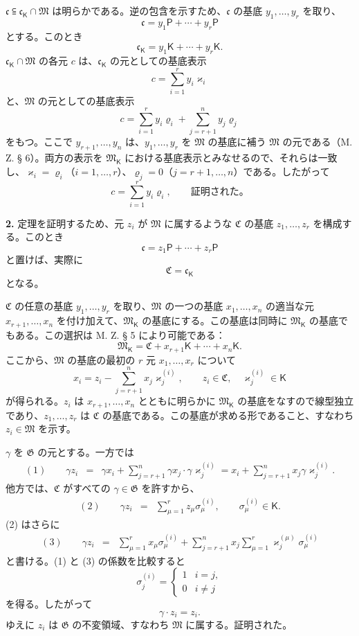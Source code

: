 $\mathfrak c\subseteqq\mathfrak c_{\mathsf K}\cap\mathfrak M$ は明らかである。逆の包含を示すため、$\mathfrak c$ の基底 $y_1,\ldots,y_r$ を取り、
\[
\mathfrak c=y_1\mathsf P+\cdots+y_r\mathsf P
\]
とする。このとき
\[
\mathfrak c_{\mathsf K}=y_1\mathsf K+\cdots+y_r\mathsf K.
\]
$\mathfrak c_{\mathsf K}\cap\mathfrak M$ の各元 $c$ は、$\mathfrak c_{\mathsf K}$ の元としての基底表示
\[
c=\sum_{i=1}^{r}y_i\varkappa_i
\]
と、$\mathfrak M$ の元としての基底表示
\[
c=\sum_{i=1}^{r}y_i\varrho_i+\sum_{j=r+1}^{n}y_j\varrho_j
\]
をもつ。ここで $y_{r+1},\ldots,y_n$ は、$y_1,\ldots,y_r$ を $\mathfrak M$ の基底に補う $\mathfrak M$ の元である（M. Z. § 6）。両方の表示を $\mathfrak M_{\mathsf K}$ における基底表示とみなせるので、それらは一致し、$\varkappa_i=\varrho_i$（$i=1,\ldots,r$）、$\varrho_j=0$（$j=r+1,\ldots,n$）である。したがって
\[
c=\sum_{i=1}^{r}y_i\varrho_i,
\qquad\text{証明された。}
\]

\textbf{2.} 定理を証明するため、元 $z_i$ が $\mathfrak M$ に属するような $\mathfrak C$ の基底 $z_1,\ldots,z_r$ を構成する。このとき
\[
\mathfrak c=z_1\mathsf P+\cdots+z_r\mathsf P
\]
と置けば、実際に
\[
\mathfrak C=\mathfrak c_{\mathsf K}
\]
となる。

$\mathfrak C$ の任意の基底 $y_1,\ldots,y_r$ を取り、$\mathfrak M$ の一つの基底 $x_1,\ldots,x_n$ の適当な元 $x_{r+1},\ldots,x_n$ を付け加えて、$\mathfrak M_{\mathsf K}$ の基底にする。この基底は同時に $\mathfrak M_{\mathsf K}$ の基底でもある。この選択は M. Z. § 5 により可能である：
\[
\mathfrak M_{\mathsf K}=\mathfrak C+x_{r+1}\mathsf K+\cdots+x_n\mathsf K.
\]
ここから、$\mathfrak M$ の基底の最初の $r$ 元 $x_1,\ldots,x_r$ について
\[
x_i=z_i-\sum_{j=r+1}^{n}x_j\varkappa_j^{(i)},\qquad
z_i\in\mathfrak C,\quad \varkappa_j^{(i)}\in\mathsf K
\]
が得られる。$z_i$ は $x_{r+1},\ldots,x_n$ とともに明らかに $\mathfrak M_{\mathsf K}$ の基底をなすので線型独立であり、$z_1,\ldots,z_r$ は $\mathfrak C$ の基底である。この基底が求める形であること、すなわち $z_i\in\mathfrak M$ を示す。

$\gamma$ を $\mathfrak G$ の元とする。一方では
\[
\begin{array}{rcl}
(1)\qquad \gamma z_i
&=&\gamma x_i+\displaystyle\sum_{j=r+1}^{n}\gamma x_j\cdot \gamma\varkappa_j^{(i)}
=x_i+\displaystyle\sum_{j=r+1}^{n}x_j\gamma\varkappa_j^{(i)}.
\end{array}
\]
他方では、$\mathfrak C$ がすべての $\gamma\in\mathfrak G$ を許すから、
\[
\begin{array}{rcl}
(2)\qquad \gamma z_i&=&\displaystyle\sum_{\mu=1}^{r}z_\mu\sigma_\mu^{(i)},
\qquad \sigma_\mu^{(i)}\in\mathsf K.
\end{array}
\]
(2) はさらに
\[
\begin{array}{rcl}
(3)\qquad \gamma z_i
&=&\displaystyle\sum_{\mu=1}^{r}x_\mu\sigma_\mu^{(i)}
+\displaystyle\sum_{j=r+1}^{n}x_j\sum_{\mu=1}^{r}\varkappa_j^{(\mu)}\sigma_\mu^{(i)}
\end{array}
\]
と書ける。(1) と (3) の係数を比較すると
\[
\sigma_j^{(i)}=
\begin{cases}
1 & i=j,\\
0 & i\ne j
\end{cases}
\]
を得る。したがって
\[
\gamma\cdot z_i=z_i.
\]
ゆえに $z_i$ は $\mathfrak G$ の不変領域、すなわち $\mathfrak M$ に属する。証明された。

